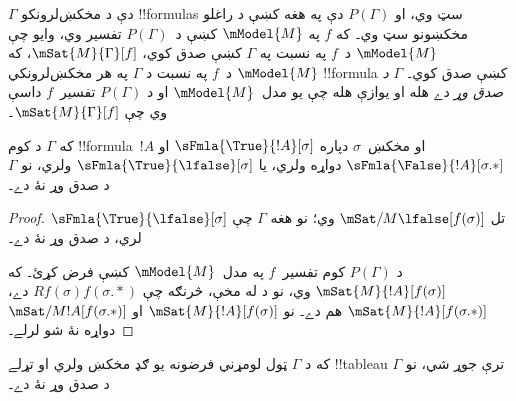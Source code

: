 \documentclass[../../../include/open-logic-section]{subfiles}
\begin{document}
\begin{defn}
  $\Gamma$ دې د مخکښ‌لرونکو !!{formula}s سټ وي، او $P(\Gamma)$
  دې په هغه کښې د راغلو مخکښونو سټ وي۔ که $f$ په
  $\mModel{M}$ کښې د~$P(\Gamma)$ تفسير وي، وايو چې
  $\mModel{M}$ د~$f$ په نسبت په $\Gamma$ کښې صدق کوي،
  $\mSat{M}{\Gamma}[f]$، که $\mModel{M}$ د~$f$ په نسبت د
  $\Gamma$ په هر مخکښ‌لرونکي !!{formula} کښې صدق کوي۔
  $\Gamma$ \emph{د صدق وړ} دے هله او يوازې هله چې يو
  مدل~$\mModel{M}$ او د $P(\Gamma)$ تفسير~$f$ داسې وي چې
  $\mSat{M}{\Gamma}[f]$۔
\end{defn}

\begin{prop}
  که $\Gamma$ د کوم !!{formula}~$!A$ او مخکښ~$\sigma$ دپاره
  $\sFmla{\True}{!A}[\sigma]$ او
  $\sFmla{\False}{!A}[\sigma.{*}]$ دواړه ولري، يا
  $\sFmla{\True}{\lfalse}[\sigma]$ ولري، نو $\Gamma$ د صدق
  وړ نۀ دے۔
\end{prop}

\begin{proof}
  تل $\mSat/{M}{\lfalse}[f(\sigma)]$ وي؛ نو هغه $\Gamma$ چې
  $\sFmla{\True}{\lfalse}[\sigma]$ لري، د صدق وړ نۀ دے۔

  د $P(\Gamma)$ کوم تفسير~$f$ په مدل~$\mModel{M}$ کښې
  فرض کړئ۔ که
  $\mSat{M}{!A}[f(\sigma)]$ وي، نو د
   له مخې، څرنګه چې
  $Rf(\sigma)f(\sigma.{*})$ دے،
  $\mSat{M}{!A}[f(\sigma.{*})]$ هم دے۔ نو
  $\mSat{M}{!A}[f(\sigma)]$ او
  $\mSat/{M}{!A}[f(\sigma.{*})]$ دواړه نۀ شو لرلے۔
\end{proof}

\begin{thm}[سموالے]
  که د $\Gamma$ ټول لومړني فرضونه يو ګډ مخکښ ولري او
  تړلے !!{tableau} ترې جوړ شي، نو $\Gamma$ د صدق وړ نۀ دے۔
\end{thm}
\end{document}
